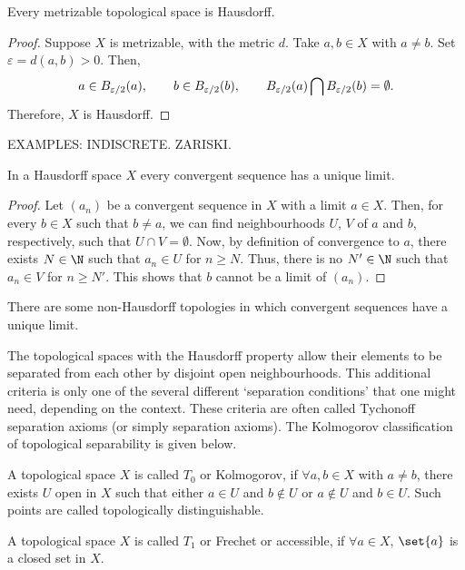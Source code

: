 \begin{nlemma}
  Every metrizable topological space is Hausdorff.
\end{nlemma}
\begin{proof}
  Suppose $X$ is metrizable, with the metric $d$. Take $a, b \in X$ with $a \neq b$. Set $\varepsilon = d(a,b) > 0$. Then,
  \begin{equation*}
    a \in B_{\varepsilon/2}(a),
    \qquad
    b \in B_{\varepsilon/2}(b),
    \qquad
    B_{\varepsilon/2}(a) \bigcap B_{\varepsilon/2}(b) = \emptyset.
  \end{equation*}
  Therefore, $X$ is Hausdorff.
\end{proof}

EXAMPLES: INDISCRETE. ZARISKI.

\begin{nlemma}
  In a Hausdorff space $X$ every convergent sequence has a unique limit.
\end{nlemma}
\begin{proof}
  Let $(a_n)$ be a convergent sequence in $X$ with a limit $a \in X$. Then, for every $b \in X$ such that $b \neq a$, we can find neighbourhoods $U$, $V$ of $a$ and $b$, respectively, such that $U \cap V = \emptyset$. Now, by definition of convergence to $a$, there exists $N \in \N$ such that $a_n \in U$ for $n \geq N$. Thus, there is no $N' \in \N$ such that $a_n \in V$ for $n \geq N'$. This shows that $b$ cannot be a limit of $(a_n)$.
\end{proof}
There are some non-Hausdorff topologies in which convergent sequences have a unique limit.

The topological spaces with the Hausdorff property allow their elements to be separated from each other by disjoint open neighbourhoods. This additional criteria is only one of the several different `separation conditions' that one might need, depending on the context. These criteria are often called Tychonoff separation axioms (or simply separation axioms). The Kolmogorov classification of topological separability is given below.
\begin{ndfn}[$T_{0}$ spaces]
  A topological space $X$ is called $T_0$ or Kolmogorov, if $\forall a, b \in X$ with $a \neq b$, there exists $U$ open in $X$ such that either $a \in U$ and $b \notin U$ or $a \notin U$ and $b \in U$. Such points are called topologically distinguishable.
\end{ndfn}

\begin{ndfn}[$T_{1}$ spaces]
  A topological space $X$ is called $T_1$ or Frechet or accessible, if $\forall a \in X$, $\set{a}$ is a closed set in $X$.
\end{ndfn}

